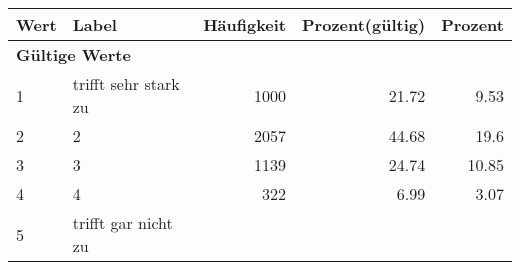     \begin{longtable}{lXrrr}
     \toprule
     \textbf{Wert} & \textbf{Label} & \textbf{Häufigkeit} & \textbf{Prozent(gültig)} & \textbf{Prozent} \\
     \endhead
     \midrule
     \multicolumn{5}{l}{\textbf{Gültige Werte}}\\

     1 &
     \multicolumn{1}{X}{ trifft sehr stark zu   } &


       \num{1000} &
       \num[round-mode=places,round-precision=2]{21,72} &
         \num[round-mode=places,round-precision=2]{9,53} \\

     2 &
     \multicolumn{1}{X}{ 2   } &


       \num{2057} &
       \num[round-mode=places,round-precision=2]{44,68} &
         \num[round-mode=places,round-precision=2]{19,6} \\

     3 &
     \multicolumn{1}{X}{ 3   } &


       \num{1139} &
       \num[round-mode=places,round-precision=2]{24,74} &
         \num[round-mode=places,round-precision=2]{10,85} \\

     4 &
     \multicolumn{1}{X}{ 4   } &


       \num{322} &
       \num[round-mode=places,round-precision=2]{6,99} &
         \num[round-mode=places,round-precision=2]{3,07} \\

     5 &
     \multicolumn{1}{X}{ trifft gar nicht zu   } &



\end{longtable}
